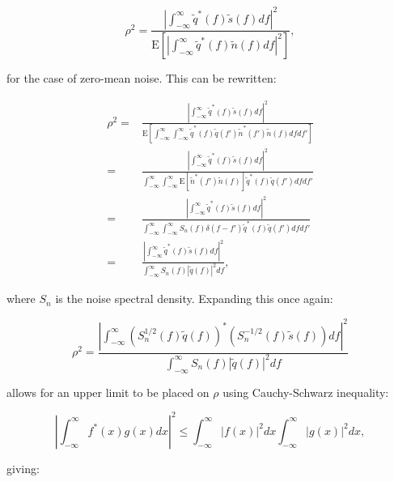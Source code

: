 \documentclass[aps,prd,nofootinbib,twocolumn,reprint,superscriptaddress,showpacs,showkeys,longbibliography]{revtex4-1}
\begin{document}
\begin{equation}
\rho^{2} =  \frac{\left|\int_{-\infty}^{\infty} \tilde{q}^{\ast}(f)\tilde{s}(f)df\right|^{2}}
{\text{E}\left[\left|\int_{-\infty}^{\infty} \tilde{q}^{\ast}(f)\tilde{n}(f)df\right|^{2}\right]},
\end{equation}

for the case of zero-mean noise.
This can be rewritten:

\begin{equation}
\begin{split}
\rho^{2} = & \frac{\left|\int_{-\infty}^{\infty} \tilde{q}^{\ast}(f)\tilde{s}(f)df\right|^{2}}
{\text{E}\left[\int_{-\infty}^{\infty}\int_{-\infty}^{\infty} \tilde{q}^{\ast}(f)\tilde{q}(f')\tilde{n}^{\ast}(f')\tilde{n}(f)dfdf'\right]} \\ 
= & \frac{\left|\int_{-\infty}^{\infty} \tilde{q}^{\ast}(f)\tilde{s}(f)df\right|^{2}}
{\int_{-\infty}^{\infty}\int_{-\infty}^{\infty} \text{E}\left[\tilde{n}^{\ast}(f')\tilde{n}(f)\right]\tilde{q}^{\ast}(f)\tilde{q}(f')dfdf'} \\
= & \frac{\left|\int_{-\infty}^{\infty} \tilde{q}^{\ast}(f)\tilde{s}(f)df\right|^{2}}
{\int_{-\infty}^{\infty}\int_{-\infty}^{\infty} S_{n}(f)\delta(f-f')\tilde{q}^{\ast}(f)\tilde{q}(f')dfdf'} \\
= & \frac{\left|\int_{-\infty}^{\infty} \tilde{q}^{\ast}(f)\tilde{s}(f)df\right|^{2}}
{\int_{-\infty}^{\infty}S_{n}(f)|\tilde{q}(f)|^{2}df},
\end{split}
\end{equation}

where $S_n$ is the noise spectral density.
Expanding this once again:

\begin{equation}
\rho^{2} = \frac{\left|\int_{-\infty}^{\infty} \left(S_{n}^{1/2}(f)\tilde{q}(f)\right)^{\ast}\left(S_{n}^{-1/2}(f)\tilde{s}(f)\right)df\right|^{2}}
{\int_{-\infty}^{\infty}S_{n}(f)|\tilde{q}(f)|^{2}df}
\end{equation}

allows for an upper limit to be placed on $\rho$ using Cauchy-Schwarz inequality:

\begin{equation}
\left|\int_{-\infty}^{\infty} f^{\ast}(x)g(x)dx\right|^{2} \le \int_{-\infty}^{\infty}\left|f(x)\right|^{2}dx \int_{-\infty}^{\infty}\left|g(x)\right|^{2}dx,
\end{equation}

giving:
\end{document}
